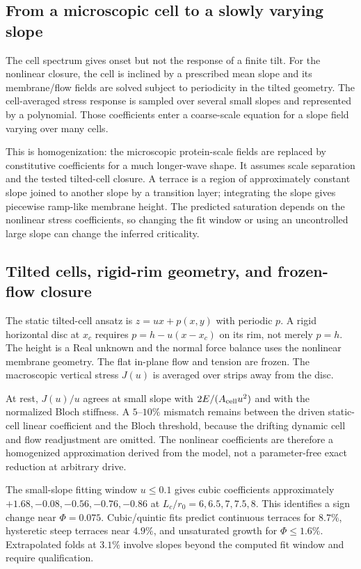 \subsection{From a microscopic cell to a slowly varying slope}
The cell spectrum gives onset but not the response of a finite tilt. For the nonlinear closure, the cell is inclined by a prescribed mean slope and its membrane/flow fields are solved subject to periodicity in the tilted geometry. The cell-averaged stress response is sampled over several small slopes and represented by a polynomial. Those coefficients enter a coarse-scale equation for a slope field varying over many cells.

This is homogenization: the microscopic protein-scale fields are replaced by constitutive coefficients for a much longer-wave shape. It assumes scale separation and the tested tilted-cell closure. A terrace is a region of approximately constant slope joined to another slope by a transition layer; integrating the slope gives piecewise ramp-like membrane height. The predicted saturation depends on the nonlinear stress coefficients, so changing the fit window or using an uncontrolled large slope can change the inferred criticality.


\subsection{Tilted cells, rigid-rim geometry, and frozen-flow closure}


The static tilted-cell ansatz is $z=ux+p(x,y)$ with periodic $p$. A rigid horizontal disc at $x_c$ requires $p=h-u(x-x_c)$ on its rim, not merely $p=h$. The height is a Real unknown and the normal force balance uses the nonlinear membrane geometry. The flat in-plane flow and tension are frozen. The macroscopic vertical stress $J(u)$ is averaged over strips away from the disc.

At rest, $J(u)/u$ agrees at small slope with $2E/(A_{\rm cell}u^2)$ and with the normalized Bloch stiffness. A $5$--$10\%$ mismatch remains between the driven static-cell linear coefficient and the Bloch threshold, because the drifting dynamic cell and flow readjustment are omitted. The nonlinear coefficients are therefore a homogenized approximation derived from the model, not a parameter-free exact reduction at arbitrary drive.

The small-slope fitting window $u\leq0.1$ gives cubic coefficients approximately $+1.68,-0.08,-0.56,-0.76,-0.86$ at $L_c/r_0=6,6.5,7,7.5,8$. This identifies a sign change near $\Phi=0.075$. Cubic/quintic fits predict continuous terraces for $8.7\%$, hysteretic steep terraces near $4.9\%$, and unsaturated growth for $\Phi\leq1.6\%$. Extrapolated folds at $3.1\%$ involve slopes beyond the computed fit window and require qualification.


